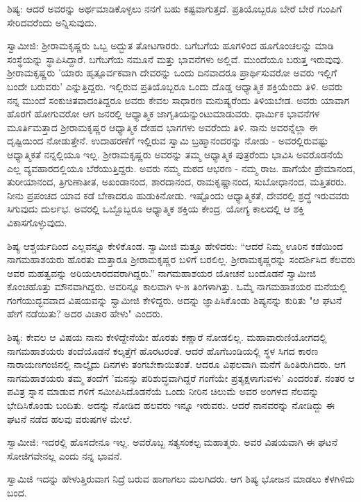 ಶಿಷ್ಯ: ಆದರೆ ಅವರನ್ನು ಅರ್ಥಮಾಡಿಕೊಳ್ಳಲು ನನಗೆ ಬಹು ಕಷ್ಟವಾಗುತ್ತದೆ. ಪ್ರತಿಯೊಬ್ಬರೂ ಬೇರೆ ಬೇರೆ ಗುಂಪಿಗೆ ಸೇರಿದವರೆಂದು ಅನ್ನಿಸುವುದು.

ಸ್ವಾಮೀಜಿ: ಶ‍್ರೀರಾಮಕೃಷ್ಣರು ಒಬ್ಬ ಅದ್ಭುತ ತೋಟಗಾರರು. ಬಗೆಬಗೆಯ ಹೂಗಳಿಂದ ಹೂಗೊಂಚಲನ್ನು ಮಾಡಿ ಸಂಸ್ಥೆಯನ್ನು ಸ್ಥಾಪಿಸಿದ್ದಾರೆ. ಬಗೆಬಗೆಯ ನಮೂನೆ ಮತ್ತು ಭಾವನೆಗಳು ಅಲ್ಲಿವೆ. ಮುಂದೆಯೂ ಬರುತ್ತ ಇರುವುವು. ಶ‍್ರೀರಾಮಕೃಷ್ಣರು 'ಯಾರು ಹೃತ್ಪೂರ್ವಕವಾಗಿ ದೇವರನ್ನು ಒಂದು ದಿನವಾದರೂ ಪ್ರಾರ್ಥಿಸುವರೋ ಅವರು ಇಲ್ಲಿಗೆ ಬಂದೇ ಬರುವರು' ಎನ್ನುತ್ತಿದ್ದರು. ಇಲ್ಲಿರುವ ಪ್ರತಿಯೊಬ್ಬರೂ ಒಂದು ದೊಡ್ಡ ಆಧ್ಯಾತ್ಮಿಕ ಶಕ್ತಿಯೆಂದು ತಿಳಿ. ಅವರು ನನ್ನ ಮುಂದೆ ಸಂಕುಚಿತವಾದಂತಿದ್ದರೂ ಅವರು ಕೇವಲ ಸಾಧಾರಣ ಮನುಷ್ಯರೆಂದು ತಿಳಿಯಬೇಡ. ಅವರು ಯಾವಾಗ ಹೊರಗೆ ಹೋಗುವರೋ ಆಗ ಜನರಲ್ಲಿ ಆಧ್ಯಾತ್ಮಿಕ ಜಾಗೃತಿಯನ್ನುಂಟುಮಾಡುವರು. ಧಾರ್ಮಿಕ ಭಾವನೆಗಳ ಮೂರ್ತಿಮತ್ತಾದ ಶ‍್ರೀರಾಮಕೃಷ್ಣರ ಆಧ್ಯಾತ್ಮಿಕ ದೇಹದ ಭಾಗಗಳು ಅವರೆಂದು ತಿಳಿ. ನಾನು ಅವರನ್ನೆಲ್ಲಾ ಈ ದೃಷ್ಟಿಯಿಂದ ನೋಡುತ್ತೇನೆ. ಉದಾಹರಣೆಗೆ ಇಲ್ಲಿರುವ ಸ್ವಾಮಿ ಬ್ರಹ್ಮಾನಂದರನ್ನು ನೋಡು - ಅವರಲ್ಲಿರುವಷ್ಟು ಆಧ್ಯಾತ್ಮಿಕತೆ ನನ್ನಲ್ಲಿಯೂ ಇಲ್ಲ. ಶ‍್ರೀರಾಮಕೃಷ್ಣರು ಅವರನ್ನು ತಮ್ಮ ಆಧ್ಯಾತ್ಮಿಕ ಪುತ್ರರೆಂದು ಭಾವಿಸಿ ಅವರೊಡನೆಯೆ ಎಲ್ಲ ವ್ಯವಹಾರದಲ್ಲಿಯೂ ಬೆರೆಯುತ್ತಿದ್ದರು. ಅವರು ನಮ್ಮ ಮಠದ ಆಭರಣ - ನಮ್ಮ ರಾಜ. ಹಾಗೆಯೇ ಪ್ರೇಮಾನಂದ, ತುರೀಯಾನಂದ, ತ್ರಿಗುಣಾತೀತ, ಅಖಂಡಾನಂದ, ಶಾರದಾನಂದ, ರಾಮಕೃಷ್ಣಾನಂದ, ಸುಬೋಧಾನಂದ, ಮತ್ತಿತರರು. ನೀನು ಪ್ರಪಂಚದ ಯಾವ ಕಡೆ ಬೇಕಾದರೂ ಹುಡುಕಿನೋಡು. ಇಷ್ಟೊಂದು ಆಧ್ಯಾತ್ಮಿಕತೆ, ದೇವರಲ್ಲಿ ಶ್ರದ್ಧೆ ಇರುವವರು ಸಿಗುವುದು ದುರ್ಲಭ. ಅವರಲ್ಲಿ ಒಬ್ಬೊಬ್ಬರೂ ಆಧ್ಯಾತ್ಮಿಕ ಶಕ್ತಿಯ ಕೇಂದ್ರ. ಯೋಗ್ಯ ಕಾಲದಲ್ಲಿ ಆ ಶಕ್ತಿ ವಿಕಾಸಗೊಳ್ಳುವುದು.

ಶಿಷ್ಯ ಆಶ್ಚರ್ಯದಿಂದ ಎಲ್ಲವನ್ನೂ ಕೇಳಿಕೊಂಡ. ಸ್ವಾಮೀಜಿ ಮತ್ತೂ ಹೇಳಿದರು: “ಆದರೆ ನಿಮ್ಮ ಊರಿನ ಕಡೆಯಿಂದ ನಾಗಮಹಾಶಯರು ಹೊರತು ಮತ್ತಾರೂ ಶ‍್ರೀರಾಮಕೃಷ್ಣರ ಬಳಿಗೆ ಬರಲಿಲ್ಲ. ಶ‍್ರೀರಾಮಕೃಷ್ಣರನ್ನು ಸಂದರ್ಶಿಸಿದ ಕೆಲವರು ಅವರ ಮಹತ್ವವನ್ನು ಅರಿಯಲಾರದವರಾಗಿದ್ದರು.” ನಾಗಮಹಾಶಯರ ಯೋಚನೆ ಬಂದೊಡನೆ ಸ್ವಾಮೀಜಿ ಕೊಂಚಹೊತ್ತು ಮೌನವಾಗಿದ್ದರು. ಅವರಿನ್ನೂ ಕಾಲವಾಗಿ ೪-೫ ತಿಂಗಳಾಗಿತ್ತು. ಒಮ್ಮೆ ನಾಗಮಹಾಶಯರ ಮನೆಯಲ್ಲಿ ಗಂಗೆಯುದ್ಭವವಾದ ವಿಷಯವನ್ನು ಸ್ವಾಮೀಜಿ ಕೇಳಿದ್ದರು. ಅದನ್ನು ಜ್ಞಾಪಿಸಿಕೊಂಡು ಶಿಷ್ಯನನ್ನು ಕುರಿತು "ಆ ಘಟನೆ ಹೇಗೆ ನಡೆಯಿತು? ಅದರ ವಿಚಾರ ಹೇಳು" ಎಂದರು.

ಶಿಷ್ಯ: ಕೇವಲ ಆ ವಿಷಯ ನಾನು ಕೇಳಿದ್ದೇನೆಯೇ ಹೊರತು ಕಣ್ಣಾರೆ ನೋಡಲಿಲ್ಲ. ಮಹಾವಾರುಣಿಯೋಗದಲ್ಲಿ ನಾಗಮಹಾಶಯರು ತಂದೆಯೊಡನೆ ಕಲ್ಕತ್ತೆಗೆ ಹೊರಟರಂತೆ. ಆದರೆ ಹೊಗೆಬಂಡಿಯಲ್ಲಿ ಸ್ಥಳ ಸಿಗದ ಕಾರಣ ನಾರಾಯಣಗಂಜಿನಲ್ಲಿ ನಾಲ್ಕೈದು ದಿನಗಳು ತಂಗಬೇಕಾಯಿತಂತೆ. ಆದರೂ ವಿಫಲವಾಗಿ ಮನೆಗೆ ಹಿಂತಿರುಗಿದರು. ಆಗ ನಾಗಮಹಾಶಯರು ತಮ್ಮ ತಂದೆಗೆ 'ಮನಸ್ಸು ಪರಿಶುದ್ಧವಾಗಿದ್ದರೆ ಗಂಗೆಯೇ ಪ್ರತ್ಯಕ್ಷಳಾಗುವಳು' ಎಂದರಂತೆ. ನಂತರ ಆ ಪವಿತ್ರ ಸ್ನಾನ ಮಾಡುವ ಗಳಿಗೆ ಸಮೀಪಿಸಿದೊಡನೆಯೆ ಒಂದು ನೀರಿನ ಚಿಲುಮೆ ಅವರ ಅಂಗಳದ ನೆಲವನ್ನು ಭೇದಿಸಿಕೊಂಡು ಬಂದಿತು. ಅದನ್ನು ನೋಡಿದ ಹಲವರು ಇನ್ನೂ ಇರುವರು. ಆದರೆ ನಾನವರನ್ನು ನೋಡಿದ್ದು ಈ ಘಟನೆ ನಡೆದ ಹಲವು ವರುಷಗಳ ಮೇಲೆ.

ಸ್ವಾಮೀಜಿ: ಇದರಲ್ಲಿ ಹೊಸದೇನೂ ಇಲ್ಲ. ಅವರೊಬ್ಬ ಸತ್ಯಸಂಕಲ್ಪ ಮಹಾತ್ಮರು. ಅವರ ವಿಷಯವಾಗಿ ಈ ಘಟನೆ ಸೋಜಿಗವೇನಲ್ಲ ಎಂದು ನನ್ನ ಭಾವನೆ.

ಸ್ವಾಮಿಜಿ ಇದನ್ನು ಹೇಳುತ್ತಿರುವಾಗ ನಿದ್ರೆ ಬರುವ ಹಾಗಾಗಲು ಮಲಗಿದರು. ಆಗ ಶಿಷ್ಯ ಭೋಜನ ಮಾಡಲು ಕೆಳಗಿಳಿದು ಬಂದ.


